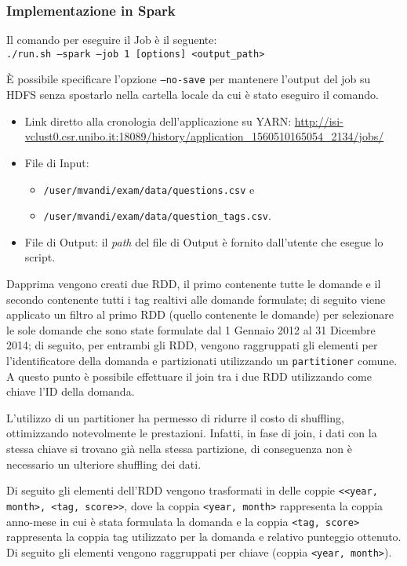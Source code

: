 \documentclass[10pt]{article}
\begin{document}
\subsubsection{Implementazione in  Spark}
Il comando per eseguire il Job è il seguente:\\
\texttt{./run.sh --spark --job 1 [options] <output\_path>}

\`E possibile specificare l'opzione \texttt{--no-save} per mantenere l'output del job su HDFS senza spostarlo nella cartella locale da cui è stato eseguiro il comando.

\begin{itemize}
\item Link diretto alla cronologia dell'applicazione su YARN:
\url{http://isi-vclust0.csr.unibo.it:18089/history/application\_1560510165054\_2134/jobs/}
\item File di Input:
\begin{itemize}
\item \texttt{/user/mvandi/exam/data/questions.csv} e\\
\item \texttt{/user/mvandi/exam/data/question\_tags.csv}.
\end{itemize}
\item File di Output: il \textit{path} del file di Output è fornito dall'utente che esegue lo script.
\end{itemize}

Dapprima vengono creati due RDD, il primo contenente tutte le domande e il secondo contenente tutti i tag realtivi alle domande formulate; di seguito viene applicato un filtro al primo RDD (quello contenente le domande) per selezionare le sole domande che sono state formulate dal 1 Gennaio 2012 al 31 Dicembre 2014; di seguito, per entrambi gli RDD, vengono raggruppati gli elementi per l'identificatore della domanda e partizionati utilizzando un \texttt{partitioner} comune. A questo punto è possibile effettuare il join tra i due RDD utilizzando come chiave l'ID della domanda.

L'utilizzo di un partitioner ha permesso di ridurre il costo di shuffling, ottimizzando notevolmente le prestazioni. Infatti, in fase di join, i dati con la stessa chiave si trovano già nella stessa partizione, di conseguenza non è necessario un ulteriore shuffling dei dati.

Di seguito gli elementi dell'RDD vengono trasformati in delle coppie \texttt{<<year, month>, <tag, score>>}, dove la coppia \texttt{<year, month>} rappresenta la coppia anno-mese in cui è stata formulata la domanda e la coppia \texttt{<tag, score>} rappresenta la coppia tag utilizzato per la domanda e relativo punteggio ottenuto. Di seguito gli elementi vengono raggruppati per chiave (coppia \texttt{<year, month>}).
\end{document}

